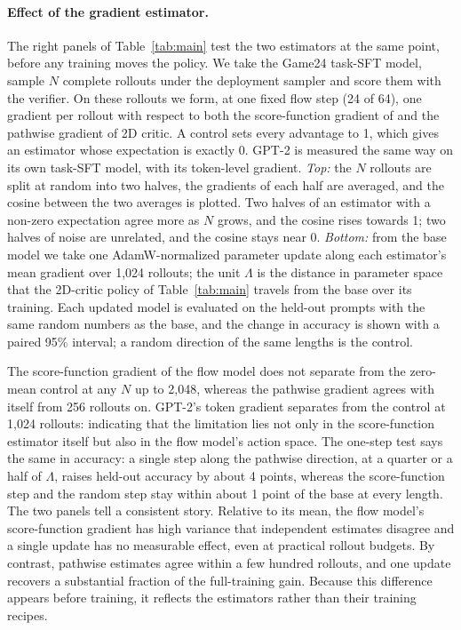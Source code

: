 \paragraph{Effect of the gradient estimator.}\label{sec:exp_estimator}
The right panels of Table~\ref{tab:main} test the two estimators at the same point, before any training moves the policy. We take the Game24 task-SFT model, sample $N$ complete rollouts under the deployment sampler and score them with the verifier. On these rollouts we form, at one fixed flow step (24 of 64), one gradient per rollout with respect to both the score-function gradient of \methodGRPO{} and the pathwise gradient of 2D critic. A control sets every advantage to 1, which gives an estimator whose expectation is exactly 0. GPT-2 is measured the same way on its own task-SFT model, with its token-level gradient. \emph{Top:} the $N$ rollouts are split at random into two halves, the gradients of each half are averaged, and the cosine between the two averages is plotted. Two halves of an estimator with a non-zero expectation agree more as $N$ grows, and the cosine rises towards 1; two halves of noise are unrelated, and the cosine stays near 0. \emph{Bottom:} from the base model we take one AdamW-normalized parameter update along each estimator's mean gradient over 1{,}024 rollouts; the unit $\Lambda$ is the distance in parameter space that the 2D-critic policy of Table~\ref{tab:main} travels from the base over its training. Each updated model is evaluated on the held-out prompts with the same random numbers as the base, and the change in accuracy is shown with a paired 95\% interval; a random direction of the same lengths is the control.

The score-function gradient of the flow model does not separate from the zero-mean control at any $N$ up to 2{,}048, whereas the pathwise gradient agrees with itself from 256 rollouts on. GPT-2's token gradient separates from the control at 1{,}024 rollouts: indicating that the limitation lies not only in the score-function estimator itself but also in the flow model's action space. The one-step test says the same in accuracy: a single step along the pathwise direction, at a quarter or a half of $\Lambda$, raises held-out accuracy by about 4 points, whereas the score-function step and the random step stay within about 1 point of the base at every length. The two panels tell a consistent story. Relative to its mean, the flow model's score-function gradient has high variance that independent estimates disagree and a single update has no measurable effect, even at practical rollout budgets. By contrast, pathwise estimates agree within a few hundred rollouts, and one update recovers a substantial fraction of the full-training gain. Because this difference appears before training, it reflects the estimators rather than their training recipes.

